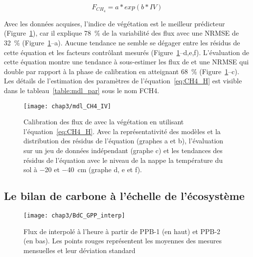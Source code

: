 \begin{equation} \label{eq:CH4_H}
F_{CH_{4}} = a*exp(b*IV)
\end{equation}

Avec les données acquises, l'indice de végétation est le meilleur prédicteur (Figure~\ref{fig:CH4_mdl}), car il explique \SI{78}{\percent} de la variabilité des flux \chh avec une NRMSE de \SI{32}{\percent} (Figure~\ref{fig:CH4_mdl}--a).
Aucune tendance ne semble se dégager entre les résidus de cette équation et les facteurs contrôlant mesurés (Figure~\ref{fig:CH4_mdl}--d,e,f).
L'évaluation de cette équation montre une tendance à sous-estimer les flux de \chh et une NRMSE qui double par rapport à la phase de calibration en atteignant \SI{68}{\percent} (Figure~\ref{fig:CH4_mdl}--c).
Les détails de l'estimation des paramètres de l'équation~\ref{eq:CH4_H} est visible dans le tableau~\ref{table:mdl_par} sous le nom FCH4.

\begin{figure}
\centering
\texttt{[image: chap3/mdl\_CH4\_IV]}
\caption{Calibration des flux de \chh avec la végétation en utilisant l'équation~\ref{eq:CH4_H}. Avec la représentativité des modèles et la distribution des résidus de l'équation (graphes a et b), l'évaluation sur un jeu de données indépendant (graphe c) et les tendances des résidus de l'équation avec le niveau de la nappe la température du sol à \num{-20} et \SI{-40}{\centi\metre} (graphe d, e et f).}
\label{fig:CH4_mdl}
\end{figure}




\subsection{Le bilan de carbone à l'échelle de l'écosystème}


\begin{figure}[!hbt]
\centering
\texttt{[image: chap3/BdC\_GPP\_interp]}
\caption{Flux de \coo interpolé à l'heure à partir de PPB-1 (en haut) et PPB-2 (en bas). Les points rouges représentent les moyennes des mesures mensuelles et leur déviation standard}
\label{fig:BdC_GPP_interp}
\end{figure}

